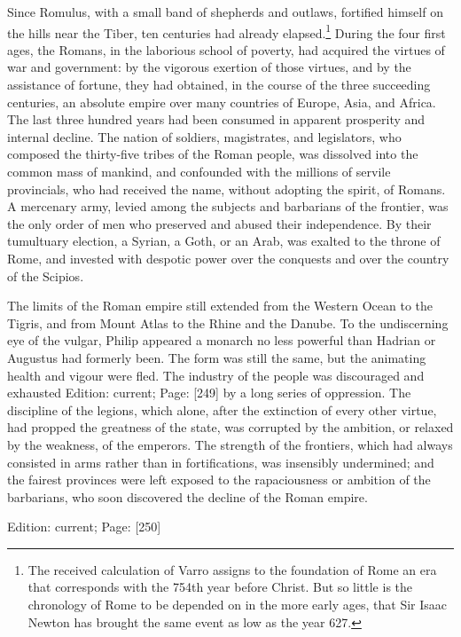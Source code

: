 Since Romulus, with a small band of shepherds and outlaws, fortified himself on the hills near the Tiber, ten centuries had already elapsed.\footnote{The received calculation of Varro assigns to the foundation of Rome an era that corresponds with the 754th year before Christ. But so little is the chronology of Rome to be depended on in the more early ages, that Sir Isaac Newton has brought the same event as low as the year 627.} During the four first ages, the Romans, in the laborious school of poverty, had acquired the virtues of war and government: by the vigorous exertion of those virtues, and by the assistance of fortune, they had obtained, in the course of the three succeeding centuries, an absolute empire over many countries of Europe, Asia, and Africa. The last three hundred years had been consumed in apparent prosperity and internal decline. The nation of soldiers, magistrates, and legislators, who composed the thirty-five tribes of the Roman people, was dissolved into the common mass of mankind, and confounded with the millions of servile provincials, who had received the name, without adopting the spirit, of Romans. A mercenary army, levied among the subjects and barbarians of the frontier, was the only order of men who preserved and abused their independence. By their tumultuary election, a Syrian, a Goth, or an Arab, was exalted to the throne of Rome, and invested with despotic power over the conquests and over the country of the Scipios.

The limits of the Roman empire still extended from the Western Ocean to the Tigris, and from Mount Atlas to the Rhine and the Danube. To the undiscerning eye of the vulgar, Philip appeared a monarch no less powerful than Hadrian or Augustus had formerly been. The form was still the same, but the animating health and vigour were fled. The industry of the people was discouraged and exhausted Edition: current; Page: [249] by a long series of oppression. The discipline of the legions, which alone, after the extinction of every other virtue, had propped the greatness of the state, was corrupted by the ambition, or relaxed by the weakness, of the emperors. The strength of the frontiers, which had always consisted in arms rather than in fortifications, was insensibly undermined; and the fairest provinces were left exposed to the rapaciousness or ambition of the barbarians, who soon discovered the decline of the Roman empire.

Edition: current; Page: [250]


